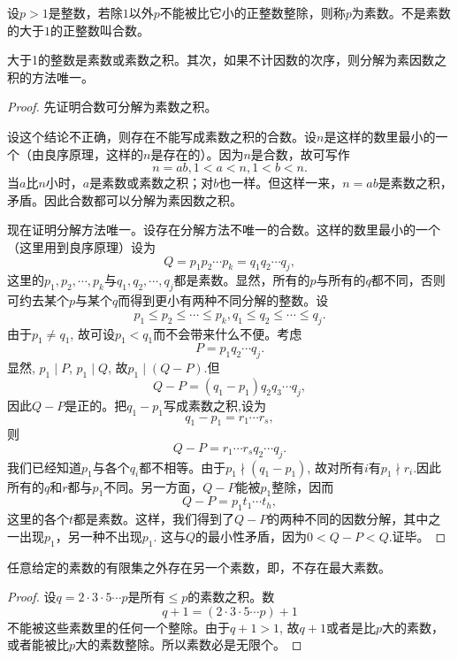 \begin{definition}{}{}
设$p > 1$是整数，若除$1$以外$p$不能被比它小的正整数整除，则称$p$为素数。不是素数的大于$1$的正整数叫合数。
\end{definition}

\begin{proposition}{}{}
大于1的整数是素数或素数之积。其次，如果不计因数的次序，则分解为素因数之积的方法唯一。
\end{proposition}

\begin{proof}
先证明合数可分解为素数之积。

设这个结论不正确，则存在不能写成素数之积的合数。设$n$是这样的数里最小的一个（由良序原理，这样的$n$是存在的）。因为$n$是合数，故可写作
\[
n = ab, 1 < a < n, 1 < b < n.
\]
当$a$比$n$小时，$a$是素数或素数之积；对$b$也一样。但这样一来，$n=ab$是素数之积，矛盾。因此合数都可以分解为素因数之积。

现在证明分解方法唯一。设存在分解方法不唯一的合数。这样的数里最小的一个（这里用到良序原理）设为
\[
Q = p_1p_2\cdots p_k = q_1q_2\cdots q_j,
\]
这里的$p_1,p_2,\cdots,p_k$与$q_1,q_2,\cdots, q_j$都是素数。显然，所有的$p$与所有的$q$都不同，否则可约去某个$p$与某个$q$而得到更小有两种不同分解的整数。设
\[
p_1 \le p_2 \le \cdots \le p_k, q_1 \le q_2 \le \cdots \le q_j.
\]
由于$p_1 \neq q_1$, 故可设$p_1 < q_1$而不会带来什么不便。考虑
\[
P = p_1q_2\cdots q_j.
\]
显然, $p_1 \mid P$, $p_1 \mid Q$, 故$p_1 \mid (Q - P)$.但
\[
Q-P = (q_1 - p_1)q_2q_3\cdots q_j,
\]
因此$Q-P$是正的。把$q_1-p_1$写成素数之积,设为
\[
q_1-p_1 = r_1\cdots r_s,
\]
则
\[
Q-P = r_1\cdots r_s q_2 \cdots q_j.
\]
我们已经知道$p_1$与各个$q_i$都不相等。由于$p_1 \nmid (q_1 - p_1)$, 故对所有$i$有$p_1 \nmid r_i$.因此所有的$q$和$r$都与$p_1$不同。另一方面，$Q-P$能被$p_1$整除，因而
\[
Q-P = p_1t_1\cdots t_h,
\]
这里的各个$t$都是素数。这样，我们得到了$Q-P$的两种不同的因数分解，其中之一出现$p_1$，另一种不出现$p_1$. 这与$Q$的最小性矛盾，因为$0 < Q-P < Q$.证毕。
\end{proof}

\begin{proposition}{}{}
任意给定的素数的有限集之外存在另一个素数，即，不存在最大素数。
\end{proposition}

\begin{proof}
设$q = 2 \cdot 3 \cdot 5 \cdots p$是所有$\le p$的素数之积。数
\[
q + 1 = (2 \cdot 3 \cdot 5 \cdots p) + 1
\]
不能被这些素数里的任何一个整除。由于$q + 1 > 1$, 故$q+1$或者是比$p$大的素数，或者能被比$p$大的素数整除。所以素数必是无限个。
\end{proof}

